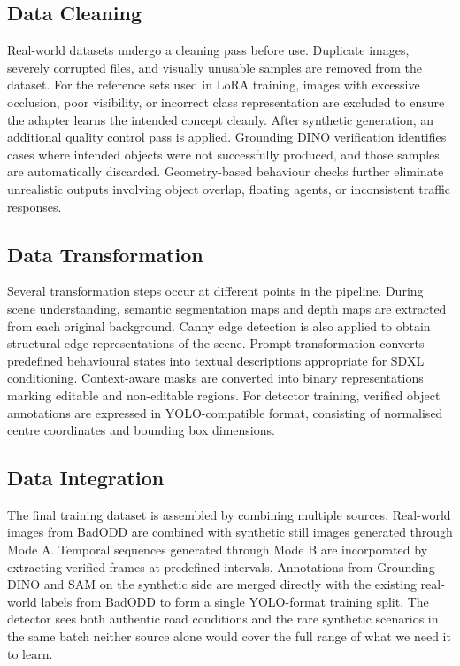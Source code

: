 \subsection{Data Cleaning}

Real-world datasets undergo a cleaning pass before use. Duplicate images, severely corrupted files, and visually unusable samples are removed from the dataset.
For the reference sets used in LoRA training, images with excessive occlusion, poor visibility, or incorrect class representation are excluded to ensure the adapter learns the intended concept cleanly.
After synthetic generation, an additional quality control pass is applied. Grounding DINO verification identifies cases where intended objects were not successfully produced, and those samples are automatically discarded. Geometry-based behaviour checks further eliminate unrealistic outputs involving object overlap, floating agents, or inconsistent traffic responses.


\subsection{Data Transformation}

Several transformation steps occur at different points in the pipeline.
During scene understanding, semantic segmentation maps and depth maps are extracted from each original background. Canny edge detection\cite{canny1986edge} is also applied to obtain structural edge representations of the scene.
Prompt transformation converts predefined behavioural states into textual descriptions appropriate for SDXL conditioning. Context-aware masks are converted into binary representations marking editable and non-editable regions.
For detector training, verified object annotations are expressed in YOLO-compatible format, consisting of normalised centre coordinates and bounding box dimensions.


\subsection{Data Integration}

The final training dataset is assembled by combining multiple sources.
Real-world images from BadODD are combined with synthetic still images generated through Mode A. Temporal sequences generated through Mode B are incorporated by extracting verified frames at predefined intervals.
Annotations from Grounding DINO and SAM on the synthetic side are merged directly with the existing real-world labels from BadODD to form a single YOLO-format training split. The detector sees both authentic road conditions and the rare synthetic scenarios in the same batch neither source alone would cover the full range of what we need it to learn.


